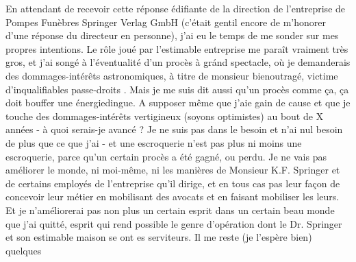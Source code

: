 En attendant de recevoir cette réponse édifiante de la direction de l'entreprise de Pompes Funèbres Springer Verlag GmbH (c'était gentil encore de m'honorer d'une réponse  du directeur en personne), j'ai eu le temps de me sonder sur mes propres intentions. Le rôle joué par l'estimable entreprise me paraît vraiment très gros, et j'ai songé à l'éventualité d'un procès à gránd spectacle, où je demanderais des dommages-intérêts astronomiques, à titre de monsieur bien\handwritten{/}outragé,  victime d'inqualifiables passe-droits . Mais je me suis dit aussi  qu'un procès comme ça, ça doit bouffer une énergie\handwritten{\(\vert\)}dingue. A supposer même que j'aie gain de cause et que je touche des dommages-intérêts vertigineux (soyons optimistes\unsure{)|!})\handwritten{,} au bout de X années\deleted{\unsure{,}} - à quoi serais-je avancé ? Je ne suis pas dans le besoin et n'ai nul besoin de plus que ce que j'ai - et une escroquerie n'est pas plus ni moins une escroquerie, parce qu'un certain procès a été gagné, ou perdu. Je ne vais pas améliorer le monde, ni moi-même, ni les manières de Monsieur K.F. Springer et de certains employés de l'entreprise qu'il dirige, et en tous cas pas leur façon de concevoir leur métier\handwritten{,} en mobilisant des avocats et en  faisant mobiliser les leurs\inserted{\handwritten{(*)}}.  Et je n'améliorerai pas non plus un certain esprit dans un certain beau monde que j'ai quitté, esprit qui rend possible le genre d'opération dont le Dr. Springer et son estimable  maison se ont  es serviteurs. Il me reste (je l'espère bien) quelques
